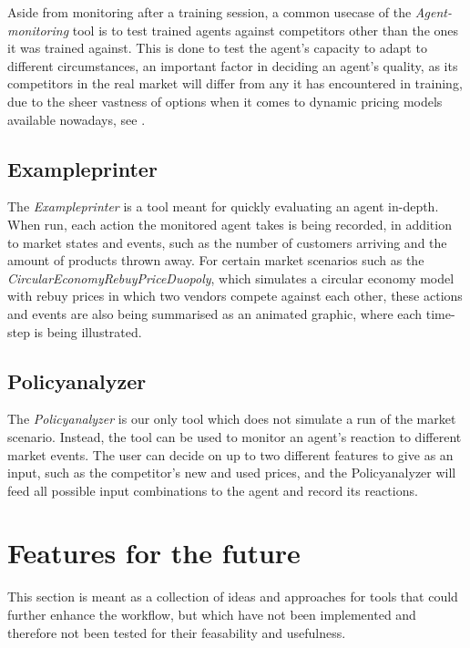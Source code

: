 Aside from monitoring after a training session, a common usecase of the \emph{Agent-monitoring} tool is to test trained agents against competitors other than the ones it was trained against. This is done to test the agent's capacity to adapt to different circumstances, an important factor in deciding an agent's quality, as its competitors in the real market will differ from any it has encountered in training, due to the sheer vastness of options when it comes to dynamic pricing models available nowadays, see .

\subsection*{Exampleprinter}

The \emph{Exampleprinter} is a tool meant for quickly evaluating an agent in-depth. When run, each action the monitored agent takes is being recorded, in addition to market states and events, such as the number of customers arriving and the amount of products thrown away. For certain market scenarios such as the \emph{CircularEconomyRebuyPriceDuopoly}, which simulates a circular economy model with rebuy prices in which two vendors compete against each other, these actions and events are also being summarised as an animated graphic, where each time-step is being illustrated. 

\subsection*{Policyanalyzer}

The \emph{Policyanalyzer} is our only tool which does not simulate a run of the market scenario. Instead, the tool can be used to monitor an agent's reaction to different market events. The user can decide on up to two different features to give as an input, such as the competitor's new and used prices, and the Policyanalyzer will feed all possible input combinations to the agent and record its reactions. 

\section{Features for the future}

This section is meant as a collection of ideas and approaches for tools that could further enhance the workflow, but which have not been implemented and therefore not been tested for their feasability and usefulness.